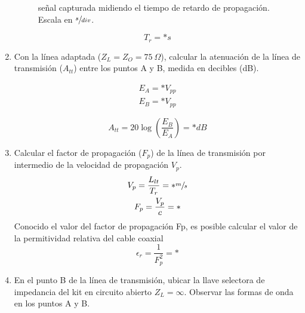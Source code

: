 \begin{enumerate}
        \begin{figure}[!ht]
          \centering
          \caption{señal capturada midiendo el tiempo de retardo de propagación. Escala en $\sfrac{s}{div}$.}
          \label{fig:sig_plot3}
        \end{figure}
        \begin{equation*}
          T_r = *s
        \end{equation*}
      \item Con la línea adaptada ($Z_L = Z_O = 75 \ \Omega$), calcular la atenuación de la línea de transmisión
        ($A_{tt}$) entre los puntos A y B, medida en decibles (dB).
        \begin{figure}[!ht]
          \centering
          \begin{minipage}{0.45\textwidth}
            \centering
            \begin{align*}
              E_A = *V_{pp} \\
              E_B = *V_{pp}
            \end{align*}
          \end{minipage}
          \hfill
          \begin{minipage}{0.45\textwidth}
            \centering
            \begin{equation*}
              A_{tt} = 20 \log \left( \frac{E_B}{E_A} \right) = *dB
            \end{equation*}
          \end{minipage}
        \end{figure}
      \item Calcular el factor de propagación ($F_p$) de la línea de transmisión por intermedio de la velocidad de
        propagación $V_p$.
        \begin{gather*}
          V_p = \frac{L_{lt}}{T_r} = * \sfrac{m}{s} \\
          F_p = \frac{V_p}{c} = *
        \end{gather*}
        Conocido el valor del factor de propagación Fp, es posible calcular el valor de la permitividad relativa
         del cable coaxial
        \begin{equation*}
          \epsilon_r = \frac{1}{F_p^2} = * 
        \end{equation*}
      \item En el punto B de la línea de transmisión, ubicar la llave selectora de impedancia del kit en circuito
        abierto $Z_L = \infty$. Observar las formas de onda en los puntos A y B.

\end{enumerate}

